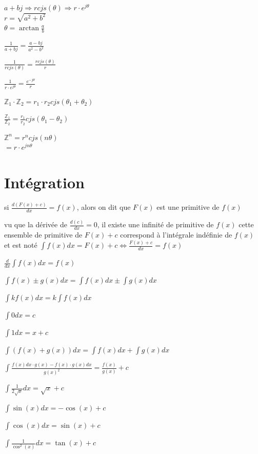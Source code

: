\documentclass[a4paper,12pt]{article}
\newcommand\tab[1][]{\hspace*{#1}}
\newcommand\Warning{%
 \makebox[1.4em][c]{%
 \makebox[0pt][c]{\raisebox{.1em}{\small!}}%
 \makebox[0pt][c]{\color{red}\Large$\bigtriangleup$}}}%
\begin{document}
$a + bj \Rightarrow r cjs(\theta ) \Rightarrow r \cdot e^{j\theta}$ \\
\tab[1cm]$r=\sqrt{a^2 + b^2}$ \\
\tab[1cm]$\theta = \arctan \frac{a}{b}$

$\frac{1}{a + bj} = \frac{a - bj}{a^2 - b^2}$

$\frac{1}{rcjs(\theta)} = \frac{rcjs(\theta)}{r}$

$\frac{1}{r \cdot e^{j\theta}} = \frac{e^{-j\theta}}{r}$

$\mathbb{Z}_1 \cdot \mathbb{Z}_2 = r_1 \cdot r_2 cjs(\theta_1 + \theta_2)$

$\frac{\mathbb{Z}_1}{\mathbb{Z}_2}  = \frac{r_1}{r_2} cjs(\theta_1 - \theta_2)$

$\mathbb{Z}^n = r^ncjs(n\theta)$\\
\tab[.6cm]$= r \cdot e^{jn\theta}$

\newpage
\section{Intégration}

si $\frac{d(F(x)+c)}{dx} = f(x)$, alors on dit que $F(x)$ est une primitive de $f(x)$

\Warning vu que la dérivée de $\frac{d(c)}{dx}=0$, il existe une infinité de primitive de $f(x)$ cette ensemble de primitive de $F(x)+c$ correspond à l'intégrale indéfinie de $f(x)$ et est noté $\int{f(x)dx=F(x)+c} \Leftrightarrow \frac{F(x)+c}{dx}=f(x)$  

\vspace{\baselineskip}
$\frac{d}{dx}\int{f(x)dx}=f(x)$

$\int{f(x)\pm g(x)dx}=\int{f(x)dx}\pm \int{g(x)dx}$

$\int{k f(x)dx}= k\int{f(x)dx}$

\vspace{\baselineskip}
$\int{0 dx} = c$

$\int{1 dx} = x +c$

$\int{(f(x)+g(x)) dx} = \int{f(x)dx} + \int{g(x)dx}$

$\int{\frac{f(x)dx \cdot g(x) - f(x) \cdot g(x)dx}{g(x)^2} } = \frac{f(x)}{g(x)} + c$

$\int{\frac{1}{2\sqrt{x}}dx} = \sqrt{x} +c$

$\int{\sin(x)dx} = -\cos(x)+c$

$\int{\cos(x) dx} = \sin(x)+c$

$\int{\frac{1}{\cos^2(x)} dx} = \tan(x) +c$
\end{document}
